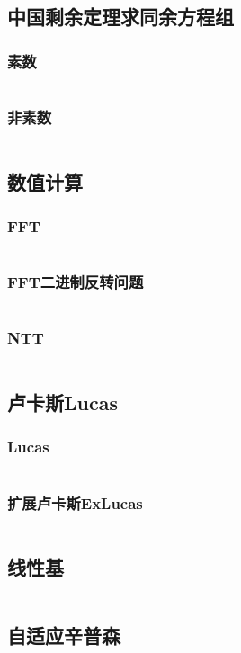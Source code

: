\documentclass[twoside,sub3section,UTF8]{ctexart}						%
\begin{document}
	\subsection{中国剩余定理求同余方程组}
		\subsubsection{素数}
			\inputminted{c++}{"Maths/CRT(prime).cpp"}
		\subsubsection{非素数}
			\inputminted{c++}{"Maths/CRT(notprime).cpp"}
	\subsection{数值计算}
		\subsubsection{FFT}
			\inputminted{c++}{"Maths/FFT/FFT.cpp"}
		\subsubsection{FFT二进制反转问题}
			\inputminted{c++}{"Maths/FFT/FFTbitrev.cpp"}
		\subsubsection{NTT}
			\inputminted{c++}{"Maths/FFT/NTT.cpp"}
	\subsection{卢卡斯Lucas}
		\subsubsection{Lucas}
			\inputminted{c++}{"Maths/Lucas/lucas.cpp"}
		\subsubsection{扩展卢卡斯ExLucas} 
			\inputminted{c++}{"Maths/Lucas/exlucas.cpp"}
	\subsection{线性基}
		\inputminted{c++}{"Maths/线性基.cpp"}
	\subsection{自适应辛普森}
		\inputminted{c++}{"Maths/自适应辛普森.cpp"}
\end{document}
